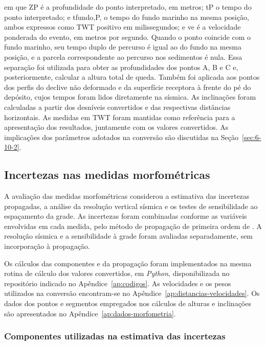 \noindent
em que ZP é a profundidade do ponto interpretado, em metros; tP o tempo do ponto interpretado; e tfundo,P, o tempo do fundo marinho na mesma posição, ambos expressos como TWT positivo em milissegundos; e ve é a velocidade ponderada do evento, em metros por segundo. Quando o ponto coincide com o fundo marinho, seu tempo duplo de percurso é igual ao do fundo na mesma posição, e a parcela correspondente ao percurso nos sedimentos é nula. Essa separação foi utilizada para obter as profundidades dos pontos A, B e C e, posteriormente, calcular a altura total de queda. Também foi aplicada aos pontos dos perfis do declive não deformado e da superfície receptora à frente do pé do depósito, cujos tempos foram lidos diretamente na sísmica. As inclinações foram calculadas a partir dos desníveis convertidos e das respectivas distâncias horizontais. As medidas em TWT foram mantidas como referência para a apresentação dos resultados, juntamente com os valores convertidos. As implicações dos parâmetros adotados na conversão são discutidas na Seção~\ref{sec:6-10-2}.

\subsection{Incertezas nas medidas morfométricas}\label{sec:4-3-9}

A avaliação das medidas morfométricas considerou a estimativa das incertezas propagadas, a análise da resolução vertical sísmica e os testes de sensibilidade ao espaçamento da grade. As incertezas foram combinadas conforme as variáveis envolvidas em cada medida, pelo método de propagação de primeira ordem de . A resolução sísmica e a sensibilidade à grade foram avaliadas separadamente, sem incorporação à propagação.

Os cálculos das componentes e da propagação foram implementados na mesma rotina de cálculo dos valores convertidos, em \textit{Python}, disponibilizada no repositório indicado no Apêndice~\ref{ap:codigos}. As velocidades e os pesos utilizados na conversão encontram-se no Apêndice~\ref{ap:distancias-velocidades}. Os dados dos pontos e segmentos empregados nos cálculos de alturas e inclinações são apresentados no Apêndice~\ref{ap:dados-morfometria}.

\subsubsection{Componentes utilizadas na estimativa das incertezas}\label{sec:4-3-9-1}

